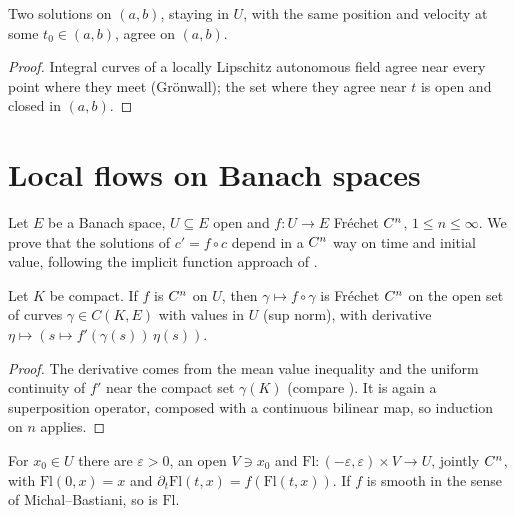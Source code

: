 \begin{theorem}[Uniqueness]
  \label{thm:quadratic-ode-uniqueness}
  \leanok
  Two solutions on $(a, b)$, staying in $U$, with the same position and velocity at some
  $t_0 \in (a, b)$, agree on $(a, b)$.
\end{theorem}

\begin{proof}
  \leanok
  Integral curves of a locally Lipschitz autonomous field agree near every point where they meet
  (Gr\"onwall); the set where they agree near $t$ is open and closed in $(a, b)$.
\end{proof}

\section{Local flows on Banach spaces}

Let $E$ be a Banach space, $U \subseteq E$ open and $f \colon U \to E$ Fr\'echet $C^{n}$,
$1 \le n \le \infty$. We prove that the solutions of $c' = f \circ c$ depend in a $C^{n}$ way on
time and initial value, following the implicit function approach of \cite[Ch.~IV, \S1]{Lan99}.

\begin{lemma}
  \label{lem:superposition-banach}
  \leanok
  Let $K$ be compact. If $f$ is $C^{n}$ on $U$, then $\gamma \mapsto f \circ \gamma$ is
  Fr\'echet $C^{n}$ on the open set of curves $\gamma \in C(K, E)$ with values in $U$ (sup norm),
  with derivative $\eta \mapsto (s \mapsto f'(\gamma(s))\,\eta(s))$.
\end{lemma}

\begin{proof}
  \leanok
  The derivative comes from the mean value inequality and the uniform continuity of $f'$ near the
  compact set $\gamma(K)$ (compare \cite[Lemma~IV.1.12]{Lan99}). It is again a superposition
  operator, composed with a continuous bilinear map, so induction on $n$ applies.
\end{proof}

\begin{theorem}
  \label{thm:banach-local-flow}
  \leanok
  For $x_0 \in U$ there are $\varepsilon > 0$, an open $V \ni x_0$ and
  $\mathrm{Fl} \colon (-\varepsilon, \varepsilon) \times V \to U$, jointly $C^{n}$, with
  $\mathrm{Fl}(0, x) = x$ and $\partial_t \mathrm{Fl}(t, x) = f(\mathrm{Fl}(t, x))$. If $f$ is
  smooth in the sense of Michal--Bastiani, so is $\mathrm{Fl}$.
\end{theorem}

